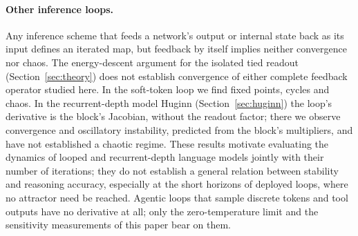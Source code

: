 \documentclass[11pt,letterpaper]{article}
\begin{document}
\paragraph{Other inference loops.} Any inference scheme that feeds a network's output or internal state back as its
input defines an iterated map, but feedback by itself implies neither convergence nor chaos. The energy-descent
argument for the isolated tied readout (Section~\ref{sec:theory}) does not establish convergence of either complete
feedback operator studied here. In the soft-token loop we find fixed points, cycles and chaos. In the recurrent-depth
model Huginn (Section~\ref{sec:huginn}) the loop's derivative is the block's Jacobian, without the readout factor;
there we observe convergence and oscillatory instability, predicted from the block's multipliers, and have not
established a chaotic regime. These results motivate evaluating the dynamics of looped and recurrent-depth language models
\cite{zhu2025ouro,bae2025mor} jointly with their number of iterations; they do not establish a general relation
between stability and reasoning accuracy, especially at the short horizons of deployed loops, where no attractor need
be reached. Agentic loops that sample discrete tokens and tool outputs have no derivative at all; only the
zero-temperature limit and the sensitivity measurements of this paper bear on them.

\begingroup{}
\end{document}

